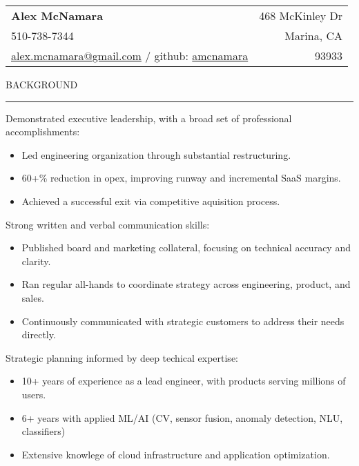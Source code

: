 \documentclass[12pt]{article}
\makeatletter
\newenvironment{justifycolumns}
{\begin{tabular*}{\textwidth}{@{\extracolsep{\fill}} lr@{}}}
{\end{tabular*}}
\newcommand{\row}[2]{#1 & #2 \\}
\newcommand{\blockseparation}{\vspace{0.13in}}
\newcommand{\heading}[1]{
	\vspace{0.05in}
	\uppercase{#1}
	\vspace{0.05in}
	\hrule
	\blockseparation
}
\newcommand{\bulletheading}[1]{
	\vspace{0.075in}
	\hspace{0.1in}
	{#1}
	\vspace{0.03in}
}
\newenvironment{tightbullets}
{\begin{itemize}}
{\end{itemize}}
\makeatother
\begin{document}
\begin{flushleft}

\begin{justifycolumns}
	\row{\large\textbf{Alex McNamara}}{468 McKinley Dr}
	\row{510-738-7344}{Marina, CA}
	\row{
		\href{mailto:alex.mcnamara@gmail.com}{alex.mcnamara@gmail.com} / github: 
		\href{http://www.github.com/amcnamara}{amcnamara}
	}{93933}
\end{justifycolumns}
\vspace{0.175in}

\heading{Background}
\bulletheading{Demonstrated executive leadership, with a broad set of professional accomplishments:}
\begin{tightbullets}
	\item Led engineering organization through substantial restructuring.
	\item 60+\% reduction in opex, improving runway and incremental SaaS margins.
	\item Achieved a successful exit via competitive aquisition process.
\end{tightbullets}

\bulletheading{Strong written and verbal communication skills:}
\begin{tightbullets}
	\item Published board and marketing collateral, focusing on technical accuracy and clarity.
	\item Ran regular all-hands to coordinate strategy across engineering, product, and sales.
	\item Continuously communicated with strategic customers to address their needs directly.
\end{tightbullets}

\bulletheading{Strategic planning informed by deep techical expertise:}
\begin{tightbullets}
	\item 10+ years of experience as a lead engineer, with products serving millions of users.
	\item 6+ years with applied ML/AI (CV, sensor fusion, anomaly detection, NLU, classifiers)
	\item Extensive knowlege of cloud infrastructure and application optimization.
\end{tightbullets}

\blockseparation


\end{flushleft}
\end{document}
